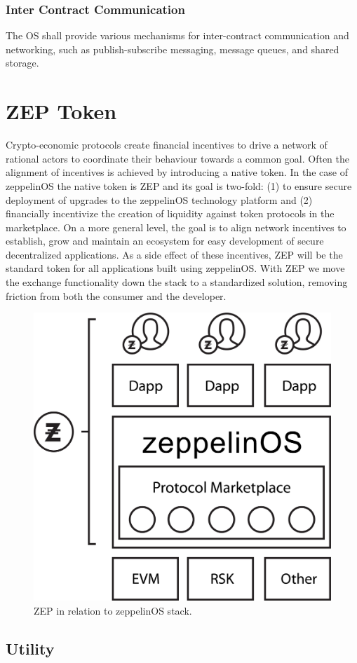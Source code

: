 \documentclass[]{article}
\makeatletter
\DeclareRobustCommand{\_}{%
  \leavevmode\vbox{%
    \hrule\@width.5em
          \@height-.26ex
          \@depth\dimexpr.26ex+.28pt\relax}}
\makeatother
\begin{document}
\subsubsection{Inter Contract Communication}

The OS shall provide various mechanisms for inter-contract
communication and networking, such as publish-subscribe messaging,
message queues, and shared storage.

\section{ZEP Token}

Crypto-economic protocols create financial incentives to drive a
network of rational actors to coordinate their behaviour towards a
common goal. Often the alignment of incentives is achieved by
introducing a native token. In the case of zeppelinOS the native token
is ZEP and its goal is two-fold: (1) to ensure secure
deployment of upgrades to the zeppelinOS technology platform and (2)
financially incentivize the creation of liquidity against token
protocols in the marketplace. On a more general level, the goal is to
align network incentives to establish, grow and maintain an ecosystem
for easy development of secure decentralized applications. As a side
effect of these incentives, ZEP will be the standard token for all
applications built using zeppelinOS. With ZEP we move the exchange
functionality down the stack to a standardized solution, removing
friction from both the consumer and the
developer.

\begin{figure}
  \centering
  \includegraphics[width=0.4\linewidth]{images/image5.jpg}
  \caption{ZEP in relation to zeppelinOS stack.}
\end{figure}

\subsection{Utility}
\end{document}
